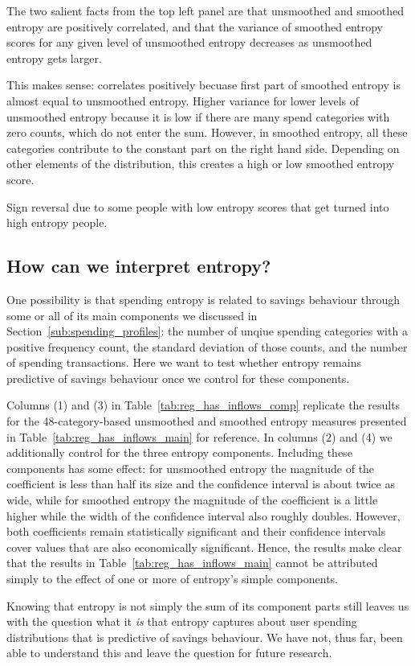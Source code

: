 The two salient facts from the top left panel are that unsmoothed and smoothed
entropy are positively correlated, and that the variance of smoothed entropy
scores for any given level of unsmoothed entropy decreases as unsmoothed
entropy gets larger.

This makes sense: correlates positively becuase first part of smoothed entropy
is almost equal to unsmoothed entropy. Higher variance for lower levels of
unsmoothed entropy because it is low if there are many spend categories with zero
counts, which do not enter the sum. However, in smoothed entropy, all these
categories contribute to the constant part on the right hand side. Depending on
other elements of the distribution, this creates a high or low smoothed entropy
score.

Sign reversal due to some people with low entropy scores that get turned into
high entropy people.



\subsection{How can we interpret entropy?}%
\label{sub:is_entropy_more_than_the_sum_of_its_parts_}

One possibility is that spending entropy is related to savings behaviour
through some or all of its main components we discussed in
Section~\ref{sub:spending_profiles}: the number of unqiue spending categories
with a positive frequency count, the standard deviation of those counts, and
the number of spending transactions. Here we want to test whether entropy
remains predictive of savings behaviour once we control for these components.



Columns (1) and (3) in Table~\ref{tab:reg_has_inflows_comp} replicate the
results for the 48-category-based unsmoothed and smoothed entropy measures
presented in Table~\ref{tab:reg_has_inflows_main} for reference. In columns (2)
and (4) we additionally control for the three entropy components. Including
these components has some effect: for unsmoothed entropy the magnitude of the
coefficient is less than half its size and the confidence interval is about
twice as wide, while for smoothed entropy the magnitude of the coefficient is a
little higher while the width of the confidence interval also roughly doubles.
However, both coefficients remain statistically significant and their
confidence intervals cover values that are also economically significant.
Hence, the results make clear that the results in
Table~\ref{tab:reg_has_inflows_main} cannot be attributed simply to the effect
of one or more of entropy's simple components.

Knowing that entropy is not simply the sum of its component parts still leaves
us with the question what it \textit{is} that entropy captures about user
spending distributions that is predictive of savings behaviour. We have not,
thus far, been able to understand this and leave the question for future
research.



